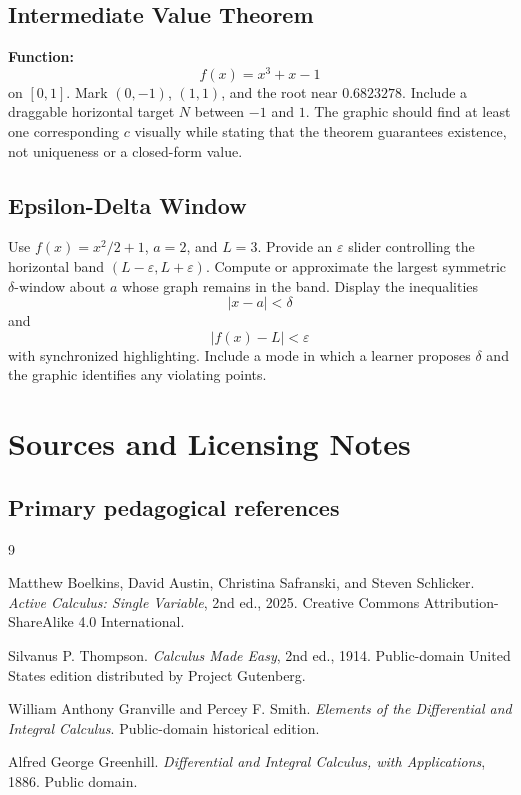 \documentclass[11pt,openany]{book}
\theoremstyle{bgplain}
\newcommand{\eps}{\varepsilon}
\begin{document}
\section{Intermediate Value Theorem}

\begin{bggraphspec}
\textbf{Function:}
\[
  f(x)=x^3+x-1
\]
on \([0,1]\). Mark \((0,-1)\), \((1,1)\), and the root near \(0.6823278\). Include a draggable horizontal target \(N\) between \(-1\) and \(1\). The graphic should find at least one corresponding \(c\) visually while stating that the theorem guarantees existence, not uniqueness or a closed-form value.
\end{bggraphspec}

\section{Epsilon-Delta Window}

\begin{bggraphspec}
Use \(f(x)=x^2/2+1\), \(a=2\), and \(L=3\). Provide an \(\eps\) slider controlling the horizontal band \((L-\eps,L+\eps)\). Compute or approximate the largest symmetric \(\delta\)-window about \(a\) whose graph remains in the band. Display the inequalities
\[
  |x-a|<\delta
\]
and
\[
  |f(x)-L|<\eps
\]
with synchronized highlighting. Include a mode in which a learner proposes \(\delta\) and the graphic identifies any violating points.
\end{bggraphspec}



\chapter{Sources and Licensing Notes}

\section*{Primary pedagogical references}

\begin{thebibliography}{9}

Matthew Boelkins, David Austin, Christina Safranski, and Steven Schlicker.
\emph{Active Calculus: Single Variable}, 2nd ed., 2025.
Creative Commons Attribution-ShareAlike 4.0 International.

Silvanus P. Thompson.
\emph{Calculus Made Easy}, 2nd ed., 1914.
Public-domain United States edition distributed by Project Gutenberg.

William Anthony Granville and Percey F. Smith.
\emph{Elements of the Differential and Integral Calculus}.
Public-domain historical edition.

Alfred George Greenhill.
\emph{Differential and Integral Calculus, with Applications}, 1886.
Public domain.

\end{thebibliography}
\end{document}
